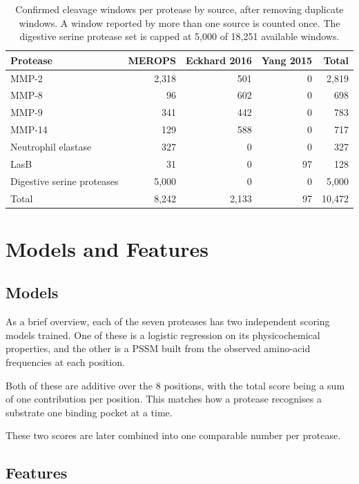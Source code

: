 \documentclass[10pt,a4paper]{article}
\numberwithin{equation}{section}
\begin{document}
\begin{table}[H]
\centering
\small\renewcommand{\arraystretch}{1.2}
\begin{tabular}{@{}lrrrr@{}}
\toprule
Protease & MEROPS & Eckhard 2016 & Yang 2015 & Total \\
\midrule
MMP-2 & 2,318 & 501 & 0 & 2,819 \\
MMP-8 & 96 & 602 & 0 & 698 \\
MMP-9 & 341 & 442 & 0 & 783 \\
MMP-14 & 129 & 588 & 0 & 717 \\
Neutrophil elastase & 327 & 0 & 0 & 327 \\
LasB & 31 & 0 & 97 & 128 \\
Digestive serine proteases & 5,000 & 0 & 0 & 5,000 \\
\midrule
Total & 8,242 & 2,133 & 97 & 10,472 \\
\bottomrule
\end{tabular}
\caption{Confirmed cleavage windows per protease by source, after removing duplicate windows. A window reported by more than one source is counted once. The digestive serine protease set is capped at 5,000 of 18,251 available windows.}
\label{tab:sources}
\end{table}

\section{Models and Features}
\label{sec:features}

\subsection{Models}

As a brief overview, each of the seven proteases has two independent scoring models trained. One of these is a logistic regression on its physicochemical properties, and the other is a PSSM built from the observed amino-acid frequencies at each position.

Both of these are additive over the 8 positions, with the total score being a sum of one contribution per position. This matches how a protease recognises a substrate one binding pocket at a time.

These two scores are later combined into one comparable number per protease.

\subsection{Features}
\end{document}
